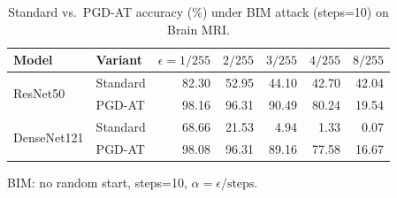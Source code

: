 \begin{table}[htbp]
  \centering
  \caption{Standard vs.\ PGD-AT accuracy (\%) under BIM attack (steps=10) on Brain MRI.}
  \label{tab:pgd_at_bim_steps10}
  \begin{tabular}{llrrrrr}
    \toprule
    Model & Variant & $\epsilon=1/255$ & $2/255$ & $3/255$ & $4/255$ & $8/255$ \\
    \midrule
    \multirow{2}{*}{ResNet50}
      & Standard & 82.30 & 52.95 & 44.10 & 42.70 & 42.04 \\
      & PGD-AT   & 98.16 & 96.31 & 90.49 & 80.24 & 19.54 \\
    \midrule
    \multirow{2}{*}{DenseNet121}
      & Standard & 68.66 & 21.53 &  4.94 &  1.33 &  0.07 \\
      & PGD-AT   & 98.08 & 96.31 & 89.16 & 77.58 & 16.67 \\
    \bottomrule
  \end{tabular}
  \vspace{0.25em}
  \begin{minipage}{0.92\linewidth}
    \footnotesize
    BIM: no random start, steps=10, $\alpha=\epsilon/\text{steps}$.
  \end{minipage}
\end{table}
